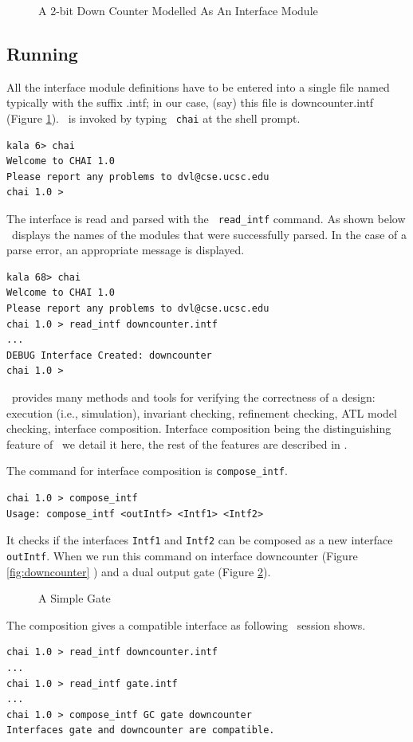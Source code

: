 \begin{figure}[h]
\centering

\caption{A 2-bit Down Counter Modelled As An Interface Module}
\label{fig:modeldowncounter}
\end{figure}

\subsection{Running \chai}
All the interface module definitions have to be entered into a
single file named typically with the suffix .intf; in our case,
(say) this file is downcounter.intf (Figure
\ref{fig:modeldowncounter}). \chai \ is invoked by typing {\tt
chai} at the shell prompt.

\begin{verbatim}
kala 6> chai
Welcome to CHAI 1.0
Please report any problems to dvl@cse.ucsc.edu
chai 1.0 >
\end{verbatim}

\noindent The interface is read and parsed with the {\tt
read\_intf} command. As shown below \chai \  displays the names of
the modules that were successfully parsed. In the case of a parse
error, an appropriate message is displayed.

\begin{verbatim}
kala 68> chai
Welcome to CHAI 1.0
Please report any problems to dvl@cse.ucsc.edu
chai 1.0 > read_intf downcounter.intf
...
DEBUG Interface Created: downcounter
chai 1.0 >
\end{verbatim}

\chai \ provides many methods and tools for verifying the
correctness of a design: execution (i.e., simulation), invariant
checking, refinement checking, ATL model checking, interface
composition. Interface composition being the distinguishing
feature of \chai \ we detail it here, the rest of the features are
described in \cite{mochaman}.

The command for interface composition is {\tt compose\_intf}.
\begin{verbatim}
chai 1.0 > compose_intf
Usage: compose_intf <outIntf> <Intf1> <Intf2>
\end{verbatim}

\noindent It checks if the interfaces {\tt Intf1} and {\tt Intf2}
can be composed as a new interface {\tt outIntf}. When we run this
command on interface downcounter (Figure \ref{fig:downcounter} )
and a dual output gate (Figure \ref{fig:gate}).
\begin{figure}[h]
\centering

\caption{A Simple Gate} \label{fig:gate}
\end{figure}
The composition gives a compatible interface as following \chai \
session shows.
\begin{verbatim}
chai 1.0 > read_intf downcounter.intf
...
chai 1.0 > read_intf gate.intf
...
chai 1.0 > compose_intf GC gate downcounter
Interfaces gate and downcounter are compatible.
\end{verbatim}


